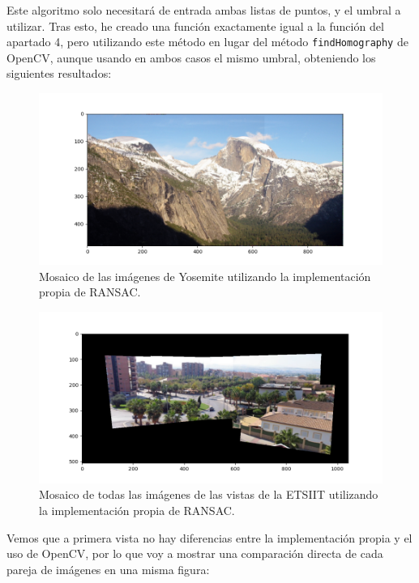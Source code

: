 \documentclass[12pt, spanish]{article}
\begin{document}
Este algoritmo solo necesitará de entrada ambas listas de puntos, y el umbral a utilizar. Tras esto, he creado una función exactamente igual a la función del apartado 4, pero utilizando este método en lugar del método \texttt{findHomography} de OpenCV, aunque usando en ambos casos el mismo umbral, obteniendo los siguientes resultados:

\begin{figure}[H]
  \centering
      \includegraphics[width=\textwidth]{mosaico_yosemite_ransac_propio.png}
 		\caption{Mosaico de las imágenes de Yosemite utilizando la implementación propia de RANSAC.}
\end{figure}

\begin{figure}[H]
  \centering
      \includegraphics[width=\textwidth]{mosaico_etsiit_ransac_propio.png}
 		\caption{Mosaico de todas las imágenes de las vistas de la ETSIIT utilizando la implementación propia de RANSAC.}
\end{figure}


Vemos que a primera vista no hay diferencias entre la implementación propia y el uso de OpenCV, por lo que voy a mostrar una comparación directa de cada pareja de imágenes en una misma figura:
\end{document}
